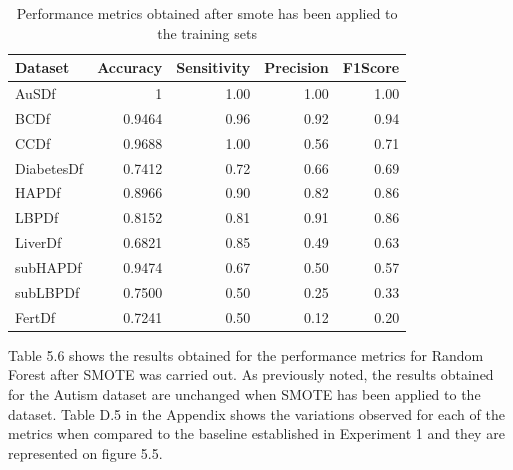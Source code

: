 \begin{table}[!htbp]
\centering
\begin{tabular}{lrrrr}
  \hline
  \rowcolor{LightCyan}
Dataset & Accuracy & Sensitivity & Precision & F1Score \\ 
  \hline
AuSDf & 1 & 1.00 & 1.00 & 1.00 \\ 
  BCDf & 0.9464 & 0.96 & 0.92 & 0.94 \\ 
  CCDf & 0.9688 & 1.00 & 0.56 & 0.71 \\ 
  DiabetesDf & 0.7412 & 0.72 & 0.66 & 0.69 \\ 
  HAPDf & 0.8966 & 0.90 & 0.82 & 0.86 \\ 
  LBPDf & 0.8152 & 0.81 & 0.91 & 0.86 \\ 
  LiverDf & 0.6821 & 0.85 & 0.49 & 0.63 \\ 
  subHAPDf & 0.9474 & 0.67 & 0.50 & 0.57 \\ 
  subLBPDf & 0.7500 & 0.50 & 0.25 & 0.33 \\ 
  FertDf & 0.7241 & 0.50 & 0.12 & 0.20 \\ 
   \hline
\end{tabular}
\caption{Performance metrics obtained after smote has been applied to the training sets}
\end{table}

Table 5.6 shows the results obtained for the performance metrics for Random Forest after SMOTE was carried out.\newline
As previously noted, the results obtained for the Autism dataset are unchanged when SMOTE has been applied to the dataset.\newline
Table D.5 in the Appendix shows the variations observed for each of the metrics when compared to the baseline established in Experiment 1 and they are represented on figure 5.5.\newline

